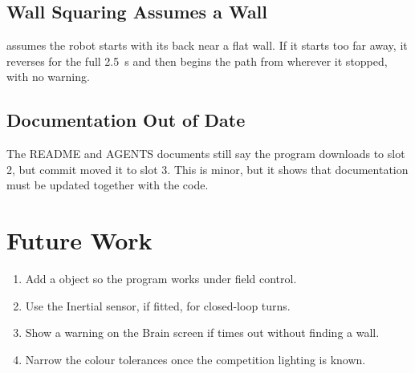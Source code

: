 \subsection{Wall Squaring Assumes a Wall}

 assumes the robot starts with its back near a flat wall. If
it starts too far away, it reverses for the full 2.5~s and then begins the path
from wherever it stopped, with no warning.

\subsection{Documentation Out of Date}

The README and AGENTS documents still say the program downloads to slot 2, but
commit  moved it to slot 3. This is minor, but it shows that
documentation must be updated together with the code.

\section{Future Work}

\begin{enumerate}
  \item Add a  object so the program works under field control.
  \item Use the Inertial sensor, if fitted, for closed-loop turns.
  \item Show a warning on the Brain screen if  times out
    without finding a wall.
  \item Narrow the colour tolerances once the competition lighting is known.
\end{enumerate}
